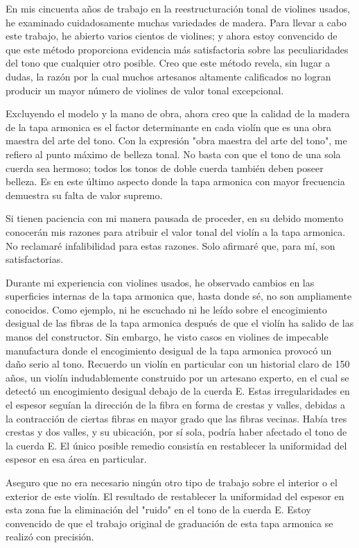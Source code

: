 \documentclass[12pt]{book}
\begin{document}
En mis cincuenta años de trabajo en la reestructuración tonal de violines usados, he examinado cuidadosamente muchas variedades de madera. Para llevar a cabo este trabajo, he abierto varios cientos de violines; y ahora estoy convencido de que este método proporciona evidencia más satisfactoria sobre las peculiaridades del tono que cualquier otro posible. Creo que este método revela, sin lugar a dudas, la razón por la cual muchos artesanos altamente calificados no logran producir un mayor número de violines de valor tonal excepcional. 

Excluyendo el modelo y la mano de obra, ahora creo que la calidad de la madera de la tapa armonica es el factor determinante en cada violín que es una obra maestra del arte del tono. Con la expresión "obra maestra del arte del tono", me refiero al punto máximo de belleza tonal. No basta con que el tono de una sola cuerda sea hermoso; todos los tonos de doble cuerda también deben poseer belleza. Es en este último aspecto donde la tapa armonica con mayor frecuencia demuestra su falta de valor supremo. 

Si tienen paciencia con mi manera pausada de proceder, en su debido momento conocerán mis razones para atribuir el valor tonal del violín a la tapa armonica. No reclamaré infalibilidad para estas razones. Solo afirmaré que, para mí, son satisfactorias.

Durante mi experiencia con violines usados, he observado cambios en las superficies internas de la tapa armonica que, hasta donde sé, no son ampliamente conocidos. Como ejemplo, ni he escuchado ni he leído sobre el encogimiento desigual de las fibras de la tapa armonica después de que el violín ha salido de las manos del constructor. Sin embargo, he visto casos en violines de impecable manufactura donde el encogimiento desigual de la tapa armonica provocó un daño serio al tono. Recuerdo un violín en particular con un historial claro de 150 años, un violín indudablemente construido por un artesano experto, en el cual se detectó un encogimiento desigual debajo de la cuerda E. Estas irregularidades en el espesor seguían la dirección de la fibra en forma de crestas y valles, debidas a la contracción de ciertas fibras en mayor grado que las fibras vecinas. Había tres crestas y dos valles, y su ubicación, por sí sola, podría haber afectado el tono de la cuerda E. El único posible remedio consistía en restablecer la uniformidad del espesor en esa área en particular. 

Aseguro que no era necesario ningún otro tipo de trabajo sobre el interior o el exterior de este violín. El resultado de restablecer la uniformidad del espesor en esta zona fue la eliminación del "ruido" en el tono de la cuerda E. Estoy convencido de que el trabajo original de graduación de esta tapa armonica se realizó con precisión.
\end{document}
